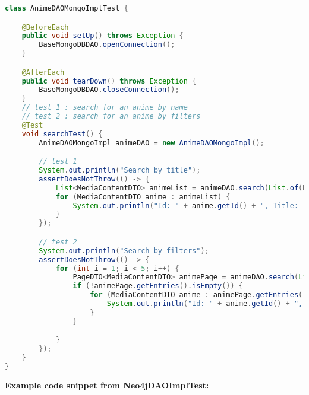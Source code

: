 \begin{mdframed}[style=customstyle]
\begin{lstlisting}[language=java]
class AnimeDAOMongoImplTest {

    @BeforeEach
    public void setUp() throws Exception {
        BaseMongoDBDAO.openConnection();
    }

    @AfterEach
    public void tearDown() throws Exception {
        BaseMongoDBDAO.closeConnection();
    }
    // test 1 : search for an anime by name
    // test 2 : search for an anime by filters
    @Test
    void searchTest() {
        AnimeDAOMongoImpl animeDAO = new AnimeDAOMongoImpl();

        // test 1
        System.out.println("Search by title");
        assertDoesNotThrow(() -> {
            List<MediaContentDTO> animeList = animeDAO.search(List.of(Pair.of("title", "Attack on Titan")), Map.of("title", 1), 1, false).getEntries();
            for (MediaContentDTO anime : animeList) {
                System.out.println("Id: " + anime.getId() + ", Title: " + anime.getTitle());
            }
        });

        // test 2
        System.out.println("Search by filters");
        assertDoesNotThrow(() -> {
            for (int i = 1; i < 5; i++) {
                PageDTO<MediaContentDTO> animePage = animeDAO.search(List.of(Pair.of("$in",Map.of("tags", List.of("school clubs", "manwha")))), Map.of("title", 1), i, false);
                if (!animePage.getEntries().isEmpty()) {
                    for (MediaContentDTO anime : animePage.getEntries()) {
                        System.out.println("Id: " + anime.getId() + ", Title: " + anime.getTitle());
                    }
                }

            }
        });
    }
}\end{lstlisting}
\end{mdframed}

\textbf{Example code snippet from Neo4jDAOImplTest:}

